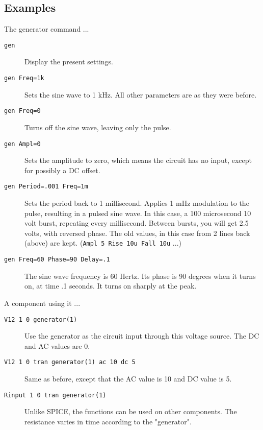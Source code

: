 \subsection{Examples}

The generator command ...

\begin{description}

\item[{\tt gen}] Display the present settings.

\item[{\tt gen Freq=1k}] Sets the sine wave to 1 kHz.  All other parameters
are as they were before.

\item[{\tt gen Freq=0}] Turns off the sine wave, leaving only the pulse.

\item[{\tt gen Ampl=0}] Sets the amplitude to zero, which means the circuit
has no input, except for possibly a DC offset.

\item[{\tt gen Period=.001 Freq=1m}] Sets the period back to 1 millisecond.
Applies 1 mHz modulation to the pulse, resulting in a pulsed sine wave.  In
this case, a 100 microsecond 10 volt burst, repeating every millisecond.
Between bursts, you will get 2.5 volts, with reversed phase.  The old
values, in this case from 2 lines back (above) are kept.  ({\tt Ampl 5 Rise
10u Fall 10u} ...)

\item[{\tt gen Freq=60 Phase=90 Delay=.1}] The sine wave frequency is 60
Hertz.  Its phase is 90 degrees when it turns on, at time .1 seconds.  It
turns on sharply at the peak.

\end{description}

A component using it ...

\begin{description}

\item[{\tt V12 1 0 generator(1)}] Use the generator as the circuit
input through this voltage source.  The DC and AC values are 0.

\item[{\tt V12 1 0 tran generator(1) ac 10 dc 5}] Same as before, except
that the AC value is 10 and DC value is 5.

\item[{\tt Rinput 1 0 tran generator(1)}] Unlike SPICE, the functions
can be used on other components.  The resistance varies in time
according to the "generator".

\end{description}

